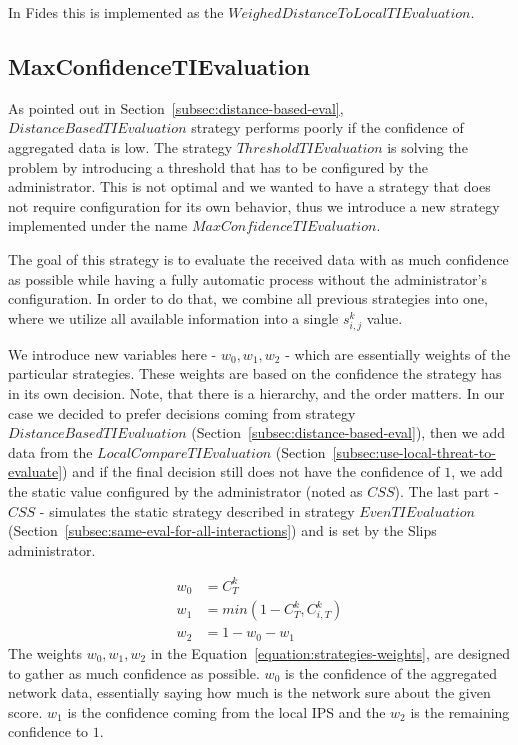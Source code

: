 \noindent
In Fides this is implemented as the $WeighedDistanceToLocalTIEvaluation$.

\subsection{MaxConfidenceTIEvaluation}
\label{subsec:MaxConfidenceTIEvaluation}
As pointed out in Section~\ref{subsec:distance-based-eval},  $DistanceBasedTIEvaluation$ strategy performs poorly if the confidence of aggregated data is low.
The strategy $ThresholdTIEvaluation$ is solving the problem by introducing a threshold that has to be configured by the administrator. This is not optimal and we wanted to have a strategy that does not require configuration for its own behavior, thus we introduce a new strategy implemented under the name $MaxConfidenceTIEvaluation$.

The goal of this strategy is to evaluate the received data with as much confidence as possible while having a fully automatic process without the administrator's configuration.
In order to do that, we combine all previous strategies into one, where we utilize all available information into a single $s^{k}_{i, j}$ value.

We introduce new variables here - $w_{0}, w_{1}, w_{2}$ - which are essentially weights of the particular strategies. These weights are based on the confidence the strategy has in its own decision.
Note, that there is a hierarchy, and the order matters. 
In our case we decided to prefer decisions coming from strategy $DistanceBasedTIEvaluation$ (Section~\ref{subsec:distance-based-eval}), then we add data from the $LocalCompareTIEvaluation$ (Section~\ref{subsec:use-local-threat-to-evaluate}) and if the final decision still does not have the confidence of $1$, we add the static value configured by the administrator (noted as $CSS$). 
The last part - $CSS$ - simulates the static strategy described in strategy $EvenTIEvaluation$ (Section~\ref{subsec:same-eval-for-all-interactions}) and is set by the Slips administrator.

\begin{equation}
\label{equation:strategies-weights}
\begin{split}
    w_{0} &= {C}^{k}_{T} \\
    w_{1} &= min(1 - {C}^{k}_{T}, {C}^{k}_{i, T}) \\
    w_{2} &= 1 - w_{0} - w_{1}
\end{split}
\end{equation}
The weights $w_{0}, w_{1}, w_{2}$ in the Equation~\ref{equation:strategies-weights}, are designed to gather as much confidence as possible. $w_{0}$ is the confidence of the aggregated network data, essentially saying how much is the network sure about the given score. 
$w_{1}$ is the confidence coming from the local IPS and the $w_{2}$ is the remaining confidence to $1$.

